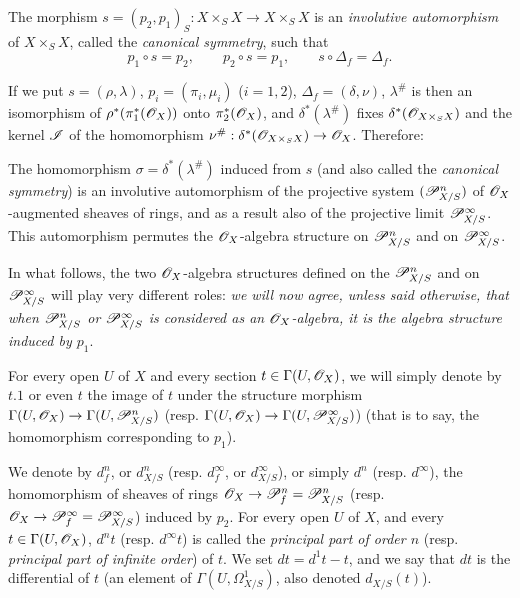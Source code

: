 \begin{env}[16.3.3]
\label{IV.16.3.3}
The morphism $s = (p_2, p_1)_S: X \times_S X \to X \times_S X$ is an \emph{involutive automorphism} of $X \times_S X$, called the \emph{canonical symmetry}, such that
\[
  \label{IV.16.3.3.1}
  p_1 \circ s = p_2, \qquad p_2 \circ s = p_1, \qquad s \circ \Delta_f = \Delta_f.
  \tag{16.3.3.1}
\]

If we put $s = (\rho, \lambda)$, $p_i = (\pi_i, \mu_i)$ ($i = 1,2$), $\Delta_f = (\delta, \nu)$, $\lambda^\#$ is then an isomorphism of $\rho^*(\pi_1^*(\mathscr{O}_X))$ onto $\pi_2^*(\mathscr{O}_X)$, and $\delta^*(\lambda^\#)$ fixes $\delta^*(\mathscr{O}_{X \times_S X})$ and the kernel $\mathscr{I}$ of the homomorphism $\nu^\#: \delta^*(\sh{O}_{X \times_S X}) \to \sh{O}_X$.
Therefore:
\end{env}

\begin{proposition}[16.3.4]
\label{IV.16.3.4}
The homomorphism $\sigma = \delta^*(\lambda^\#)$ induced from $s$ (and also called the \emph{canonical symmetry}) is an involutive automorphism of the projective system $(\mathscr{P}_{X/S}^n)$ of $\mathscr{O}_X$-augmented 
sheaves of rings, and as a result also of the projective limit $\mathscr{P}_{X/S}^\infty$.
This automorphism permutes the $\mathscr{O}_X$-algebra structure on $\mathscr{P}_{X/S}^n$ and on $\mathscr{P}_{X/S}^\infty$.
\end{proposition}

\begin{env}[16.3.5]
\label{IV.16.3.5}
In what follows, the two $\mathscr{O}_X$-algebra structures defined on the $\mathscr{P}_{X/S}^n$ and on $\mathscr{P}_{X/S}^\infty$ will play very different roles:
\emph{we will now agree, unless said otherwise, that when $\mathscr{P}_{X/S}^n$ or $\mathscr{P}_{X/S}^\infty$ is considered as an $\mathscr{O}_X$-algebra, it is the algebra structure induced by $p_1$}.
\end{env}

For every open $U$ of $X$ and every section $t \in \Gamma(U, \mathscr{O}_X)$, we will simply denote by $t.1$ or even $t$ the image of $t$ under the structure morphism $\Gamma(U, \sh{O}_X) \to \Gamma(U, \sh{P}_{X/S}^n)$ (resp. $\Gamma(U, \sh{O}_X) \to \Gamma(U, \sh{P}_{X/S}^\infty)$) (that is to say, the homomorphism corresponding to $p_1$).

\begin{definition}[16.3.6]
\label{IV.16.3.6}
We denote by $d_f^n$, or $d_{X/S}^n$ (resp. $d_f^\infty$, or $d_{X/S}^\infty$), or simply $d^n$ (resp. $d^\infty$), the homomorphism of sheaves of rings $\sh{O}_X \to \sh{P}_{f}^n = \sh{P}_{X/S}^n$ (resp. $\sh{O}_X \to \sh{P}_{f}^\infty = \sh{P}_{X/S}^\infty$) induced by $p_2$.
For every open $U$ of $X$, and every $t \in \Gamma(U, \mathscr{O}_X)$, $d^n t$ (resp. $d^\infty t$) is called the \emph{principal part of order $n$} (resp. \emph{principal part of infinite order}) of $t$.
We set $dt = d^1 t - t$, and we say that $dt$ is the differential of $t$ (an element of $\Gamma(U, \Omega_{X/S}^1)$, also denoted $d_{X/S}(t)$).
\end{definition}  

